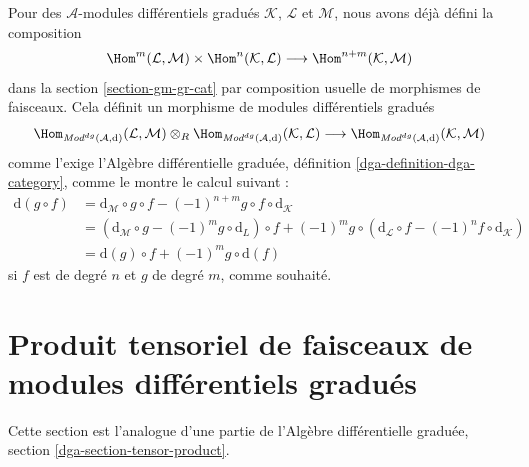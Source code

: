 \medskip\noindent
Pour des $\mathcal{A}$-modules différentiels
gradués $\mathcal{K}$, $\mathcal{L}$ et $\mathcal{M}$,
nous avons déjà défini la composition
$$
\Hom^m(\mathcal{L}, \mathcal{M}) \times
\Hom^n(\mathcal{K}, \mathcal{L}) \longrightarrow
\Hom^{n + m}(\mathcal{K}, \mathcal{M})
$$
dans la section \ref{section-gm-gr-cat} par composition usuelle
de morphismes de faisceaux. Cela définit un morphisme de modules différentiels
gradués $$
\Hom_{\textit{Mod}^{dg}(\mathcal{A}, \text{d})}(\mathcal{L}, \mathcal{M})
\otimes_R
\Hom_{\textit{Mod}^{dg}(\mathcal{A}, \text{d})}(\mathcal{K}, \mathcal{L})
\longrightarrow
\Hom_{\textit{Mod}^{dg}(\mathcal{A}, \text{d})}(\mathcal{K}, \mathcal{M})
$$
comme
l'exige l'Algèbre différentielle graduée, définition \ref{dga-definition-dga-category},
comme le montre le calcul suivant :
\begin{align*}
\text{d}(g \circ
f) & = \text{d}_\mathcal{M} \circ g \circ
f - (-1)^{n + m} g \circ f \circ \text{d}_\mathcal{K} \\
&
= \left(\text{d}_\mathcal{M} \circ g - (-1)^m g \circ \text{d}_L\right) \circ
f + (-1)^m g \circ \left(\text{d}_\mathcal{L} \circ
f - (-1)^n f \circ \text{d}_\mathcal{K}\right) \\
& =
\text{d}(g) \circ f + (-1)^m g \circ \text{d}(f)
\end{align*}
si $f$ est de degré $n$ et $g$ de degré $m$, comme souhaité.






\section{Produit tensoriel de faisceaux de modules différentiels gradués}
\label{section-tensor-product-dg}

\noindent
Cette section est l'analogue d'une partie de
l'Algèbre différentielle graduée, section \ref{dga-section-tensor-product}.

